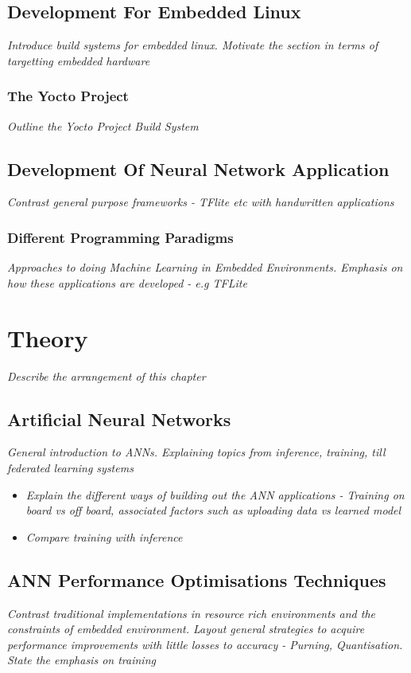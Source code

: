 \section[Development Process for Embedded Linux]{Development For Embedded Linux}
\textit{Introduce build systems for embedded linux. Motivate the section in terms of targetting embedded hardware}

\subsection[Build Systems : The Yocto Project]{The Yocto Project}
\textit{Outline the Yocto Project Build System}

\section[Development of Neural Network Application]{Development Of Neural Network Application}
\textit{Contrast general purpose frameworks - TFlite etc with handwritten applications}

\subsection{Different Programming Paradigms}
\textit{Approaches to doing Machine Learning in Embedded Environments. Emphasis on how these applications are developed - e.g TFLite}

\chapter{Theory}
{\color{blue} \textit{Describe the arrangement of this chapter}}

\section[Artificial Neural Network (ANN)]{Artificial Neural Networks}
\textit{General introduction to ANNs. Explaining topics from inference, training, till federated learning systems}

\begin{itemize}
	\item \textit{Explain the different ways of building out the ANN applications - Training on board vs off board, associated factors such as uploading data vs learned model}
	\item \textit{Compare training with inference}
\end{itemize}

\section{ANN Performance Optimisations Techniques}
\textit{Contrast traditional implementations in resource rich environments and the constraints of embedded environment. Layout general strategies to acquire performance improvements with little losses to accuracy - Purning, Quantisation. State the emphasis on training}

